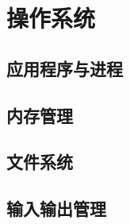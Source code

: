 \chapter{操作系统}\label{ch:os}


\section{应用程序与进程}\label{sec:os_app_process}


\section{内存管理}\label{sec:os_memory_management}


\section{文件系统}\label{sec:os:file_system}


\section{输入输出管理}\label{sec:os:io_management}